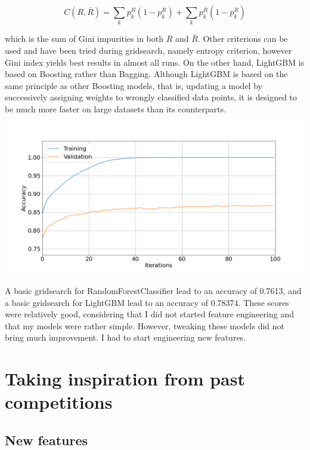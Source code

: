\documentclass{article}
\newenvironment{Figure}
  {\par\medskip\noindent\minipage{\linewidth}}
  {\endminipage\par\medskip}
\begin{document}
\begin{multicols}{2}
\begin{center}
  $$
  C(R, \bar{R}) = \sum \limits_{k} p^R_k (1 - p^R_k) +
  \sum \limits_{k} p^{\bar{R}}_k (1 - p^{\bar{R}}_k)
  $$
\end{center}

\noindent which is the sum of Gini impurities in both $R$ and $\bar{R}$.
Other criterions can be used and have been tried during gridsearch, namely entropy
criterion, however Gini index yields best results in almost all runs. On the other
hand, LightGBM is based on Boosting rather than Bagging. Although LightGBM is based
on the same principle as other Boosting models, that is, updating a model by
successively assigning weights to wrongly classified data points, it is designed to
be much more faster on large datasets than its counterparts.

\begin{Figure}
  \centering
  \includegraphics[width=\linewidth]{figures/lgbmeval.png}
  \captionsetup{type=figure}
  \label{fig:lgbmeval}
\end{Figure}

A basic
gridsearch for RandomForestClassifier
lead to an accuracy of 0.7613, and a basic gridsearch for LightGBM lead to an accuracy of 0.78374. These scores
were relatively good, considering that I did not started feature engineering
and that my models were rather simple. However, tweaking these models did not bring much
improvement. I had to start engineering new features.

\section{Taking inspiration from past competitions}

\subsection{New features}


\end{multicols}
\end{document}
